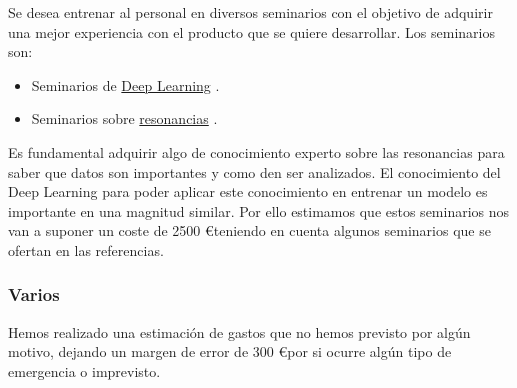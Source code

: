 Se desea entrenar al personal en diversos seminarios con el objetivo de adquirir una mejor experiencia con el producto que se quiere desarrollar. Los seminarios son:

\begin{itemize}
	\item Seminarios de \href{https://kschool.com/cursos/programa-deep-learning/}{Deep Learning} \cite{misc:learning}.
	\item Seminarios sobre \href{https://www.emagister.com/cursos-resonancia-magnetica-kwes-11454.htm}{resonancias} \cite{misc:resonancias}.
\end{itemize}

Es fundamental adquirir algo de conocimiento experto sobre las resonancias para saber que datos son importantes y como den ser analizados. El conocimiento del Deep Learning para poder aplicar este conocimiento en entrenar un modelo es importante en una magnitud similar. Por ello estimamos que estos seminarios nos van a suponer un coste de 2500 \euro teniendo en cuenta algunos seminarios que se ofertan en las referencias.

\subsubsection{Varios}

Hemos realizado una estimación de gastos que no hemos previsto por algún motivo, dejando un margen de error de 300 \euro por si ocurre algún tipo de emergencia o imprevisto.

\newpage


       
